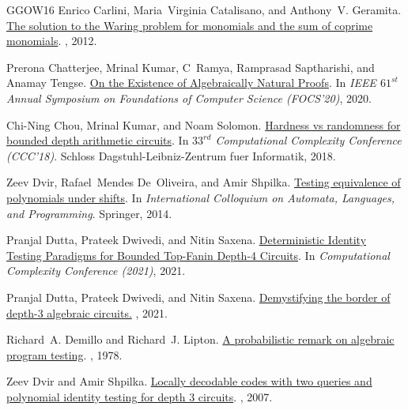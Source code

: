 \documentclass[10pt,a4paper]{article}
\numberwithin{equation}{section}
\begin{document}
\begin{thebibliography}{GGOW16}
Enrico Carlini, Maria~Virginia Catalisano, and Anthony~V. Geramita.
\newblock \href{https://doi.org/10.1016/j.jalgebra.2012.07.028}{The solution to
  the Waring problem for monomials and the sum of coprime monomials}.
, 2012.

Prerona Chatterjee, Mrinal Kumar, C~Ramya, Ramprasad Saptharishi, and Anamay
  Tengse.
\newblock \href{https://eccc.weizmann.ac.il/report/2020/063/}{On the Existence
  of Algebraically Natural Proofs}.
\newblock In {\em IEEE $61^{st}$ Annual Symposium on Foundations of Computer
  Science (FOCS'20)}, 2020.

Chi-Ning Chou, Mrinal Kumar, and Noam Solomon.
\newblock \href{https://drops.dagstuhl.de/opus/volltexte/2018/8876/}{Hardness
  vs randomness for bounded depth arithmetic circuits}.
\newblock In {\em $33^{rd}$ Computational Complexity Conference (CCC'18)}.
  Schloss Dagstuhl-Leibniz-Zentrum fuer Informatik, 2018.

Zeev Dvir, Rafael~Mendes De~Oliveira, and Amir Shpilka.
\newblock
  \href{https://link.springer.com/chapter/10.1007/978-3-662-43948-7_35}{Testing
  equivalence of polynomials under shifts}.
\newblock In {\em International Colloquium on Automata, Languages, and
  Programming}. Springer, 2014.

Pranjal Dutta, Prateek Dwivedi, and Nitin Saxena.
\newblock \href {http://dx.doi.org/10.4230/LIPIcs.CCC.2021.11} {Deterministic
  Identity Testing Paradigms for Bounded Top-Fanin Depth-4 Circuits}.
\newblock In {\em Computational Complexity Conference (2021)}, 2021.

Pranjal Dutta, Prateek Dwivedi, and Nitin Saxena.
\newblock
  \href{https://cse.iitk.ac.in/users/nitin/papers/border-depth3.pdf}{Demystifying
  the border of depth-3 algebraic circuits.}
, 2021.

Richard~A. Demillo and Richard~J. Lipton.
\newblock
  \href{https://www.sciencedirect.com/science/article/abs/pii/0020019078900674}{A
  probabilistic remark on algebraic program testing}.
, 1978.

Zeev Dvir and Amir Shpilka.
\newblock \href{https://dl.acm.org/doi/10.1137/05063605X}{Locally decodable
  codes with two queries and polynomial identity testing for depth 3 circuits}.
, 2007.


\end{thebibliography}
\end{document}
